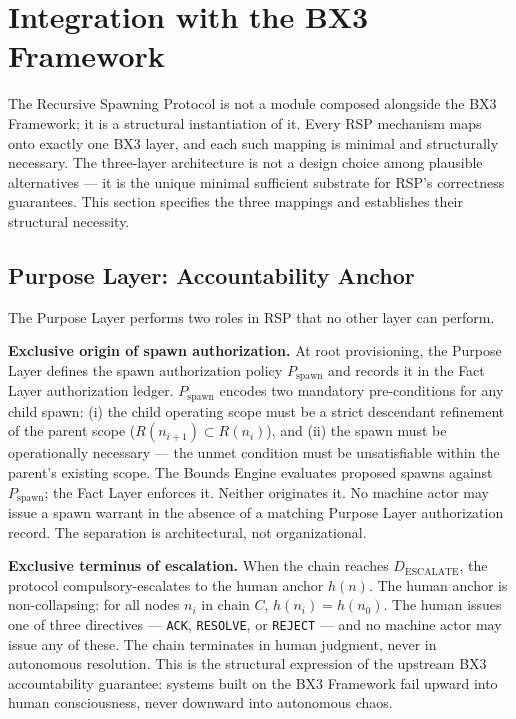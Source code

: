 \section{Integration with the BX3 Framework}
\label{sec:rs-integration}

The Recursive Spawning Protocol is not a module composed alongside the BX3 Framework; it is a structural instantiation of it. Every RSP mechanism maps onto exactly one BX3 layer, and each such mapping is minimal and structurally necessary. The three-layer architecture is not a design choice among plausible alternatives — it is the unique minimal sufficient substrate for RSP's correctness guarantees. This section specifies the three mappings and establishes their structural necessity.

\subsection{Purpose Layer: Accountability Anchor}
\label{sec:rs-purpose-anchor}

The Purpose Layer performs two roles in RSP that no other layer can perform.

\medskip
\noindent\textbf{Exclusive origin of spawn authorization.} At root provisioning, the Purpose Layer defines the spawn authorization policy $P_{\mathrm{spawn}}$ and records it in the Fact Layer authorization ledger. $P_{\mathrm{spawn}}$ encodes two mandatory pre-conditions for any child spawn: (i) the child operating scope must be a strict descendant refinement of the parent scope ($R(n_{i+1}) \subset R(n_i)$), and (ii) the spawn must be operationally necessary — the unmet condition must be unsatisfiable within the parent's existing scope. The Bounds Engine evaluates proposed spawns against $P_{\mathrm{spawn}}$; the Fact Layer enforces it. Neither originates it. No machine actor may issue a spawn warrant in the absence of a matching Purpose Layer authorization record. The separation is architectural, not organizational.

\medskip
\noindent\textbf{Exclusive terminus of escalation.} When the chain reaches $D_{\mathrm{ESCALATE}}$, the protocol compulsory-escalates to the human anchor $h(n)$. The human anchor is non-collapsing: for all nodes $n_i$ in chain $C$, $h(n_i) = h(n_0)$. The human issues one of three directives — \texttt{ACK}, \texttt{RESOLVE}, or \texttt{REJECT} — and no machine actor may issue any of these. The chain terminates in human judgment, never in autonomous resolution. This is the structural expression of the upstream BX3 accountability guarantee: systems built on the BX3 Framework fail upward into human consciousness, never downward into autonomous chaos.

